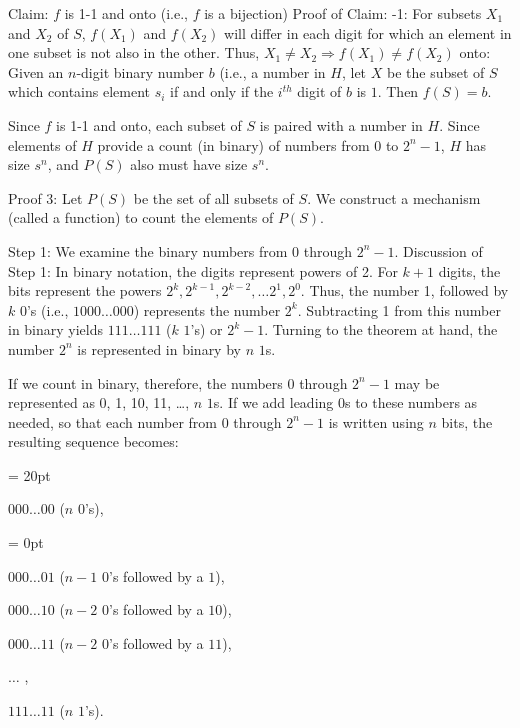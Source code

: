 {\ital Claim:}  $f$ is 1-1 and onto (i.e., $f$ is a bijection)\hfil\break
{\ital Proof of Claim:}  \hfil\break
{-1:}  For subsets  $X_1$ and $X_2$  of $S$, $f(X_1)$ and $f(X_2)$ will differ in each digit for which an element in one subset is not also in the other.  Thus, $X_1 \ne X_2 \Longrightarrow f(X_1) \ne f(X_2)$\hfil\break
{\ital onto:} Given an $n$-digit binary number $b$ (i.e., a number in $H$, let $X$ be the subset of $S$ which contains element $s_i$ if and only if the $i^{th}$ digit of $b$ is $1$.  Then $f(S) = b$.

Since $f$ is 1-1 and onto, each subset of $S$ is paired with a number in $H$.  Since elements of $H$ provide a count (in binary) of numbers from $0$ to $2^n -1$, $H$ has size $s^n$, and $P(S)$ also must have size $s^n$.

\vfill\eject

{\bold Proof 3:}  Let $P(S)$ be the set of all subsets of $S$.\hfil\break
We construct a mechanism (called a function) to count the elements of $P(S)$.

{\ital Step 1:} We examine the binary numbers from $0$ through $2^n-1$.
\hfil\break
{\ital Discussion of Step 1:}
In binary notation, the digits represent powers of 2.  For $k+1$ digits, the bits represent the powers $2^k, 2^{k-1}, 2^{k-2}, \dots 2^1, 2^0$.   Thus, the number 1, followed by $k$ $0$'s (i.e., $1000\dots 000$) represents the number $2^k$.  Subtracting 1 from this number in binary yields $111\dots 111$ ($k$ $1$'s) or $2^k-1$.  Turning to the theorem at hand, the number $2^n$ is represented in binary by $n$ $1$s.  

If we count in binary, therefore, the numbers $0$ through $2^n-1$ may be represented as 0, 1, 10, 11, \dots , $n$ $1$s.  If we add leading $0$s to these numbers as needed, so that each number from $0$ through $2^n-1$ is written using $n$ bits, the resulting sequence becomes:

{\parindent = 20pt 
\item {}$000\dots 00$ ($n$ $0$'s), 

\parskip = 0pt
\item {}$000 \dots 01$ ($n-1$ $0$'s followed by a $1$), 
\item {}$000 \dots 10$ ($n-2$ $0$'s followed by a $10$), 
\item {}$000 \dots 11$ ($n-2$ $0$'s followed by a $11$), 
\item {}$\dots$ ,
\item {}$111\dots 11$ ($n$ $1$'s).  

}

